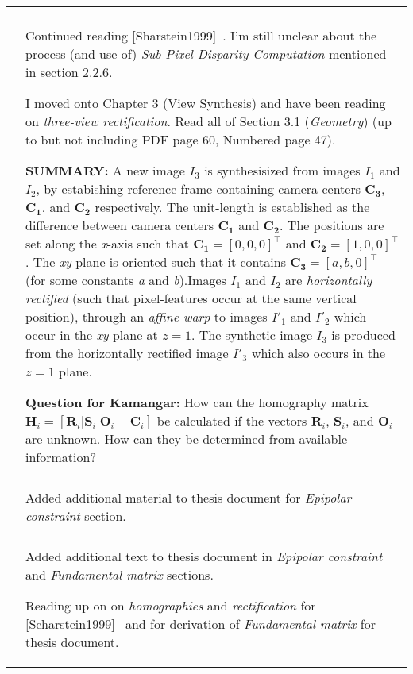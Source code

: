 \documentclass[a4paper,10pt]{article}
\newcommand{\logentry}[4]{\hline\\[-0.25ex]\selectlanguage{USenglish}\formatdate{#2}{#1}{#3}&{#4}\par\\[-0.25ex]}
\newcommand{\Kamangar}[1]{%
	{\noindent\textbf{\color{red}Question for Kamangar: }{\noindent #1} \noindent}
}
\newcommand{\SUMMARY}[1]{%
	{\noindent\textbf{\color{blue}SUMMARY: }{\noindent #1} \noindent}
}
\begin{document}
\begin{longtable}{l p{12cm} }
{		}
	\logentry{6}{22}{2016}{%
Continued reading [Sharstein1999]~\cite{Scharstein1999}. I'm still unclear about the process (and use of) \textit{Sub-Pixel Disparity Computation} mentioned in section 2.2.6.\newline
\par I moved onto Chapter 3 (View Synthesis) and have been reading on \textit{three-view rectification}. Read all of Section 3.1 (\textit{Geometry}) (up to but not including PDF page 60, Numbered page 47).\newline
\par \SUMMARY{A new image $I_3$ is synthesisized from images $I_1$ and $I_2$, by estabishing reference frame containing camera centers $\mathbf{C_3}$, $\mathbf{C_1}$, and $\mathbf{C_2}$ respectively. The unit-length is established as the difference between camera centers $\mathbf{C_1}$ and $\mathbf{C_2}$. The positions are set along the \textit{x}-axis such that $\mathbf{C_1}=[0,0,0]^\top$ and $\mathbf{C_2}=[1,0,0]^\top$. The \textit{xy}-plane is oriented such that it contains $\mathbf{C_3}=[a,b,0]^\top$ (for some constants \textit{a} and \textit{b}).Images $I_1$ and $I_2$ are \textit{horizontally rectified} (such that pixel-features occur at the same vertical position), through an \textit{affine warp} to images $I'_1$ and $I'_2$ which occur in the \textit{xy}-plane at $z=1$. The synthetic image $I_3$ is produced from the horizontally rectified image $I'_3$ which also occurs in the $z=1$ plane.
}\newline
\par \Kamangar{
How can the homography matrix $\mathbf{H}_i=[\mathbf{R}_i | \mathbf{S}_i | \mathbf{O}_i - \mathbf{C}_i]$  be calculated if the vectors $\mathbf{R}_i$, $\mathbf{S}_i$, and $\mathbf{O}_i$ are unknown. How can they be determined from available information? 
}
	}
	\logentry{6}{24}{2016}{%
Added additional material to thesis document for \textit{Epipolar constraint} section. 
	}
	\logentry{6}{25}{2016}{%
Added additional text to thesis document in \textit{Epipolar constraint} and \textit{Fundamental matrix} sections.\newline
\par Reading up on on \textit{homographies} and \textit{rectification} for [Scharstein1999]~\cite{Scharstein1999} and for derivation of \textit{Fundamental matrix} for thesis document.
}
\end{longtable}
\end{document}

